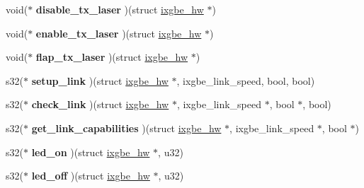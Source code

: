 \begin{DoxyCompactItemize}
\item 
\hypertarget{structixgbe__mac__operations_a9ea827aeece09de289fe60beba323acc}{
void($\ast$ {\bfseries disable\_\-tx\_\-laser} )(struct \hyperlink{structixgbe__hw}{ixgbe\_\-hw} $\ast$)}
\label{structixgbe__mac__operations_a9ea827aeece09de289fe60beba323acc}

\item 
\hypertarget{structixgbe__mac__operations_a1fcdfdbe87387e4d6550f04b57905f9e}{
void($\ast$ {\bfseries enable\_\-tx\_\-laser} )(struct \hyperlink{structixgbe__hw}{ixgbe\_\-hw} $\ast$)}
\label{structixgbe__mac__operations_a1fcdfdbe87387e4d6550f04b57905f9e}

\item 
\hypertarget{structixgbe__mac__operations_a7c601f79efbbe3a4fdd26a1b4f21cc3c}{
void($\ast$ {\bfseries flap\_\-tx\_\-laser} )(struct \hyperlink{structixgbe__hw}{ixgbe\_\-hw} $\ast$)}
\label{structixgbe__mac__operations_a7c601f79efbbe3a4fdd26a1b4f21cc3c}

\item 
\hypertarget{structixgbe__mac__operations_aae9504e9502777676912e5456fe3c3d8}{
s32($\ast$ {\bfseries setup\_\-link} )(struct \hyperlink{structixgbe__hw}{ixgbe\_\-hw} $\ast$, ixgbe\_\-link\_\-speed, bool, bool)}
\label{structixgbe__mac__operations_aae9504e9502777676912e5456fe3c3d8}

\item 
\hypertarget{structixgbe__mac__operations_a3eec5a6a49b6c84ee1a22c727fc57700}{
s32($\ast$ {\bfseries check\_\-link} )(struct \hyperlink{structixgbe__hw}{ixgbe\_\-hw} $\ast$, ixgbe\_\-link\_\-speed $\ast$, bool $\ast$, bool)}
\label{structixgbe__mac__operations_a3eec5a6a49b6c84ee1a22c727fc57700}

\item 
\hypertarget{structixgbe__mac__operations_acda092432611030b282dbfe998ded12e}{
s32($\ast$ {\bfseries get\_\-link\_\-capabilities} )(struct \hyperlink{structixgbe__hw}{ixgbe\_\-hw} $\ast$, ixgbe\_\-link\_\-speed $\ast$, bool $\ast$)}
\label{structixgbe__mac__operations_acda092432611030b282dbfe998ded12e}

\item 
\hypertarget{structixgbe__mac__operations_a4274766714cc069af30b04145243ca9b}{
s32($\ast$ {\bfseries led\_\-on} )(struct \hyperlink{structixgbe__hw}{ixgbe\_\-hw} $\ast$, u32)}
\label{structixgbe__mac__operations_a4274766714cc069af30b04145243ca9b}

\item 
\hypertarget{structixgbe__mac__operations_aadd8babd55b51f4ed018b0fea9315936}{
s32($\ast$ {\bfseries led\_\-off} )(struct \hyperlink{structixgbe__hw}{ixgbe\_\-hw} $\ast$, u32)}
\label{structixgbe__mac__operations_aadd8babd55b51f4ed018b0fea9315936}


\end{DoxyCompactItemize}
